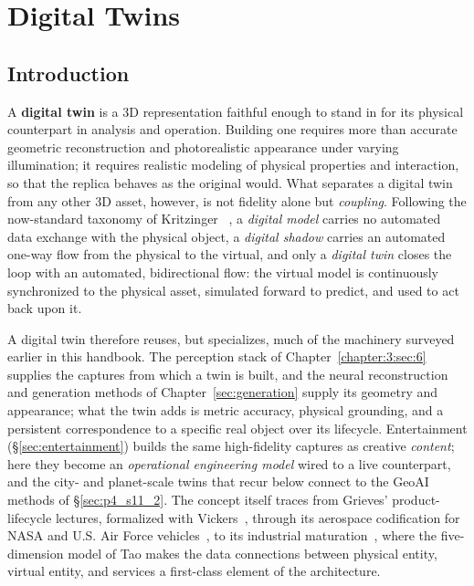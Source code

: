 \section{Digital Twins}
\label{sec:p4_s11_1}
\label{sec:Digital Twins}

\subsection{Introduction}
\label{subsec:p4-sec11-1-introduction}

A \textbf{digital twin} is a 3D representation faithful enough to stand in for its physical counterpart in analysis and operation.
Building one requires more than accurate geometric reconstruction and photorealistic appearance under varying illumination; it requires realistic modeling of physical properties and interaction, so that the replica behaves as the original would.
What separates a digital twin from any other 3D asset, however, is not fidelity alone but \emph{coupling}.
Following the now-standard taxonomy of Kritzinger \etal~\cite{kritzinger2018digital}, a \emph{digital model} carries no automated data exchange with the physical object, a \emph{digital shadow} carries an automated one-way flow from the physical to the virtual, and only a \emph{digital twin} closes the loop with an automated, bidirectional flow: the virtual model is continuously synchronized to the physical asset, simulated forward to predict, and used to act back upon it.

A digital twin therefore reuses, but specializes, much of the machinery surveyed earlier in this handbook. The perception stack of Chapter~\ref{chapter:3:sec:6} supplies the captures from which a twin is built, and the neural reconstruction and generation methods of Chapter~\ref{sec:generation} supply its geometry and appearance; what the twin adds is metric accuracy, physical grounding, and a persistent correspondence to a specific real object over its lifecycle.
Entertainment (§\ref{sec:entertainment}) builds the same high-fidelity captures as creative \emph{content}; here they become an \emph{operational engineering model} wired to a live counterpart, and the city- and planet-scale twins that recur below connect to the GeoAI methods of §\ref{sec:p4_s11_2}.
The concept itself traces from Grieves' product-lifecycle lectures, formalized with Vickers~\cite{grieves2017digital}, through its aerospace codification for NASA and U.S. Air Force vehicles~\cite{glaessgen2012digital}, to its industrial maturation~\cite{tao2019digital,wang2023survey}, where the five-dimension model of Tao \etal makes the data connections between physical entity, virtual entity, and services a first-class element of the architecture.

